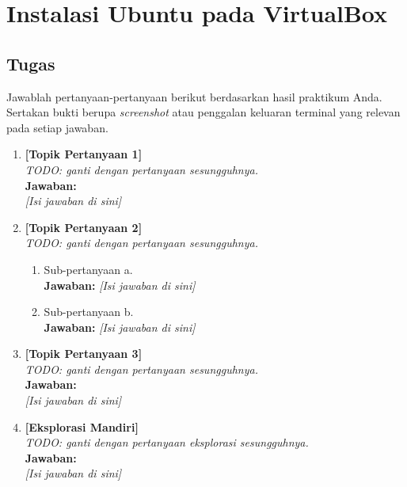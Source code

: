 
\chapter{Instalasi Ubuntu pada VirtualBox}
\label{chap:handson-01}

\section{Tugas}

Jawablah pertanyaan-pertanyaan berikut berdasarkan hasil praktikum Anda.
Sertakan bukti berupa \textit{screenshot} atau penggalan keluaran terminal
yang relevan pada setiap jawaban.

\begin{enumerate}
    \item \textbf{[Topik Pertanyaan 1]}\\
    \textit{TODO: ganti dengan pertanyaan sesungguhnya.}\\[0.3cm]
    \textbf{Jawaban:}\\
    \textit{[Isi jawaban di sini]}

    \item \textbf{[Topik Pertanyaan 2]}\\
    \textit{TODO: ganti dengan pertanyaan sesungguhnya.}
    \begin{enumerate}
        \item[(a)] Sub-pertanyaan a.\\
        \textbf{Jawaban:} \textit{[Isi jawaban di sini]}
        \item[(b)] Sub-pertanyaan b.\\
        \textbf{Jawaban:} \textit{[Isi jawaban di sini]}
    \end{enumerate}

    \item \textbf{[Topik Pertanyaan 3]}\\
    \textit{TODO: ganti dengan pertanyaan sesungguhnya.}\\[0.3cm]
    \textbf{Jawaban:}\\
    \textit{[Isi jawaban di sini]}

    \item \textbf{[Eksplorasi Mandiri]}\\
    \textit{TODO: ganti dengan pertanyaan eksplorasi sesungguhnya.}\\[0.3cm]
    \textbf{Jawaban:}\\
    \textit{[Isi jawaban di sini]}
\end{enumerate}